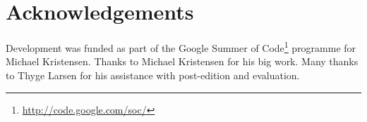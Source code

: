 \documentclass[11pt]{article}
\begin{document}

\section*{Acknowledgements}

Development was funded as part of the Google Summer of Code\footnote{\url{http://code.google.com/soc/}} 
programme for Michael Kristensen. Thanks to Michael Kristensen for his big work.
Many thanks to Thyge Larsen for his assistance with post-edition and evaluation.



\end{document}
